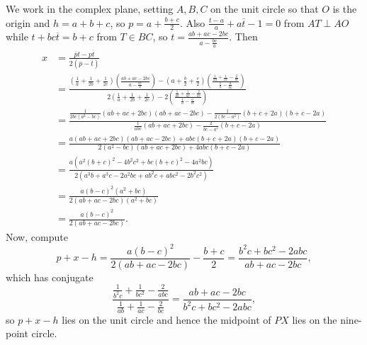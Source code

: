 We work in the complex plane, setting $A,B,C$ on the unit circle so that $O$ is the origin and $h=a+b+c$, so $p=a+\frac{b+c}{2}$. Also $\frac{t-a}{a}+a\overline{t}-1=0$ from $AT\perp AO$ while $t+bc\overline{t}=b+c$ from $T\in BC$, so $t=\frac{ab+ac-2bc}{a-\frac{bc}{a}}$. Then
\begin{align*}
	x&=\frac{\overline{p}t-p\overline{t}}{2\left(\overline{p}-\overline{t}\right)}\\
	&=\frac{\left(\frac{1}{a}+\frac{1}{2b}+\frac{1}{2c}\right)\left(\frac{ab+ac-2bc}{a-\frac{bc}{a}}\right)-\left(a+\frac{b}{2}+\frac{c}{2}\right)\left(\frac{\frac{1}{ab}+\frac{1}{ac}-\frac{2}{bc}}{\frac{1}{a}-\frac{a}{bc}}\right)}{2\left(\frac{1}{a}+\frac{1}{2b}+\frac{1}{2c}\right)-2\left(\frac{\frac{1}{ab}+\frac{1}{ac}-\frac{2}{bc}}{\frac{1}{a}-\frac{a}{bc}}\right)}\\
	&=\frac{\frac{1}{2bc\left(a^2-bc\right)}\left(ab+ac+2bc\right)\left(ab+ac-2bc\right)-\frac{1}{2\left(bc-a^2\right)}\left(b+c+2a\right)\left(b+c-2a\right)}{\frac{1}{abc}\left(ab+ac+2bc\right)-\frac{2}{bc-a^2}\left(b+c-2a\right)}\\
	&=\frac{a\left(ab+ac+2bc\right)\left(ab+ac-2bc\right)+abc\left(b+c+2a\right)\left(b+c-2a\right)}{2\left(a^2-bc\right)\left(ab+ac+2bc\right)+4abc\left(b+c-2a\right)}\\
	&=\frac{a\left(a^2\left(b+c\right)^2-4b^2c^2+bc\left(b+c\right)^2-4a^2bc\right)}{2\left(a^3b+a^3c-2a^2bc+ab^2c+abc^2-2b^2c^2\right)}\\
	&=\frac{a\left(b-c\right)^2\left(a^2+bc\right)}{2\left(ab+ac-2bc\right)\left(a^2+bc\right)}\\
	&=\frac{a\left(b-c\right)^2}{2\left(ab+ac-2bc\right)}.
\end{align*}
Now, compute \[p+x-h=\frac{a\left(b-c\right)^2}{2\left(ab+ac-2bc\right)}-\frac{b+c}{2}=\frac{b^2c+bc^2-2abc}{ab+ac-2bc},\] which has conjugate \[\frac{\frac{1}{b^2c}+\frac{1}{bc^2}-\frac{2}{abc}}{\frac{1}{ab}+\frac{1}{ac}-\frac{2}{bc}}=\frac{ab+ac-2bc}{b^2c+bc^2-2abc},\] so $p+x-h$ lies on the unit circle and hence the midpoint of $PX$ lies on the nine-point circle.